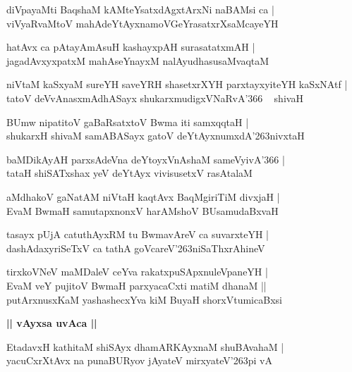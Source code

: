 \documentclass[twoside,12pt,openright]{book}
\def\S{\char'263}
\newcounter{shloka}[chapter]
\def\uvaca#1{\centerline{{\large\textbf{#1}}}}
\begin{document}
\begin{shloka}%
diVpayaMti BaqshaM kAMteYsatxdAgxtArxNi naBAMsi ca |\\
viVyaRvaMtoV mahAdeYtAyxnamoVGeYrasatxrXsaMcayeYH 
\end{shloka}

\begin{shloka}%
hatAvx ca pAtayAmAsuH kashayxpAH surasatatxmAH |\\
jagadAvxyxpatxM mahAseYnayxM nalAyudhasusaMvaqtaM 
\end{shloka}

\begin{shloka}%
niVtaM kaSxyaM sureYH saveYRH shasetxrXYH parxtayxyiteYH kaSxNAtf |\\
tatoV deVvAnasxmAdhASayx shukarxmudigxVNaRvA\char'366 ~ shivaH 
\end{shloka}

\begin{shloka}%
BUmw nipatitoV gaBaRsatxtoV Bwma iti samxqqtaH |\\
shukarxH shivaM samABASayx gatoV deYtAyxnumxdA\S nivxtaH 
\end{shloka}

\begin{shloka}%
baMDikAyAH parxsAdeVna deYtoyxVnAshaM sameVyivA\char'366 |\\
tataH shiSATxshax yeV deYtAyx vivisusetxV rasAtalaM 
\end{shloka}

\begin{shloka}%
aMdhakoV gaNatAM niVtaH kaqtAvx BaqMgiriTiM divxjaH |\\
EvaM BwmaH samutapxnonxV harAMshoV BUsamudaBxvaH 
\end{shloka}

\begin{shloka}%
tasayx pUjA catuthAyxRM tu BwmavAreV ca suvarxteYH |\\
dashAdaxyriSeTxV ca tathA goVcareV\S niSaThxrAhineV 
\end{shloka}

\begin{shloka}%
tirxkoVNeV maMDaleV ceYva rakatxpuSApxnuleVpaneYH |\\
EvaM veY pujitoV BwmaH parxyacaCxti matiM dhanaM ||\\
putArxnusxKaM yashashecxYva kiM BuyaH shorxVtumicaBxsi 
\end{shloka}

\uvaca{|| vAyxsa uvAca ||}

\begin{shloka}%
EtadavxH kathitaM shiSAyx dhamARKAyxnaM shuBAvahaM |\\
yacuCxrXtAvx na punaBURyov jAyateV mirxyateV\S pi vA
\end{shloka}
\end{document}
